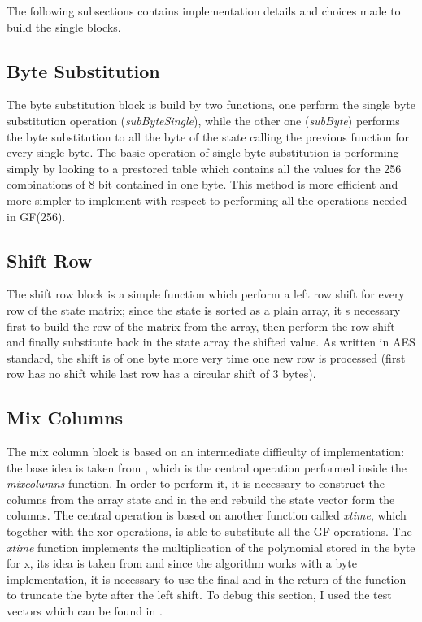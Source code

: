 \documentclass{article}
\begin{document}
The following subsections contains implementation details and choices made to build the single blocks.

\subsection{Byte Substitution}

The byte substitution block is build by two functions, one perform the single byte substitution operation (\textit {subByteSingle}), while the other one (\textit {subByte}) performs the byte substitution to all the byte of the state calling the previous function for every single byte. The basic operation of single byte substitution is performing simply by looking to a prestored table which contains all the values for the 256 combinations of 8 bit contained in one byte. This method is more efficient and more simpler to implement with respect to performing all the operations needed in GF(256).

\subsection{Shift Row}

The shift row block is a simple function which perform a left row shift for every row of the state matrix; since the state is sorted as a plain array, it s necessary first to build the row of the matrix from the array, then perform the row shift and finally substitute back in the state array the shifted value. As written in AES standard, the shift is of one byte more very time one new row is processed (first row has no shift while last row has a circular shift of 3 bytes). 

\subsection{Mix Columns}

The mix column block is based on an intermediate difficulty of implementation: the base idea is taken from \cite{10.5555/560131}, which is the central operation performed inside the \textit{mixcolumns} function. In order to perform it, it is necessary to construct the columns from the array state and in the end rebuild the state vector form the columns. The central operation is based on another function called \textit{xtime}, which together with the xor operations, is able to substitute all the GF operations. The \textit{xtime} function implements the multiplication of the polynomial stored in the byte for x, its idea is taken from \cite{AESxtime} and since the algorithm works with a byte implementation, it is necessary to use the final and in the return of the function to truncate the byte after the left shift. \newline
To debug this section, I used the test vectors which can be found in \cite{AESmixcolumn}.
\end{document}
